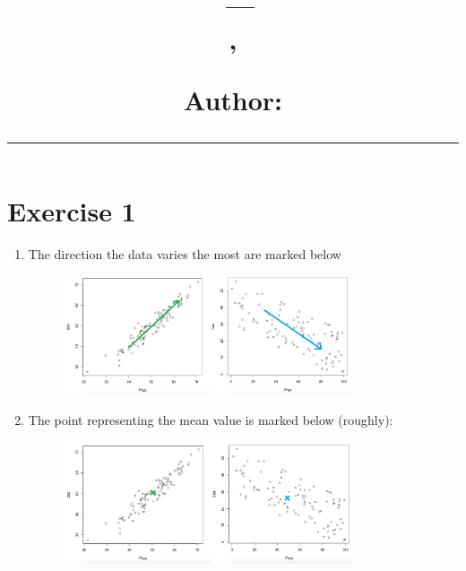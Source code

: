 \documentclass{article}
\title{\begin{flushleft}
		\vspace{-4ex}
		\courseid~--- \coursename \\[0.2cm]
		{\Large \papertitle, \term \\[0.2cm]}
		{\large Author:	\authorname \\[3ex]
			\hrule}
		\vspace{-4ex}
	\end{flushleft}
}
\date{}
\begin{document}
\setlength{\baselineskip}{1.25\baselineskip} %
\maketitle

\section*{Exercise 1}

\begin{enumerate}
	\item The direction the data varies the most are marked below
	\begin{figure}[H]
		\centering
		\includegraphics[width=0.8\textwidth]{exercise_1_a}
	\end{figure}
	
	\item The point representing the mean value is marked below (roughly):
	\begin{figure}[H]
		\centering
		\includegraphics[width=0.8\textwidth]{exercise_1_b}
	\end{figure}
	
\end{enumerate}
\end{document}
